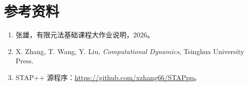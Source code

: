 ﻿\documentclass[UTF8,11pt,a4paper]{ctexart}
\begin{document}
\section*{参考资料}
\begin{enumerate}
  \item 张雄，有限元法基础课程大作业说明，2026。
  \item X. Zhang, T. Wang, Y. Liu, \textit{Computational Dynamics}, Tsinghua University Press.
  \item STAP++ 源程序：\url{https://github.com/xzhang66/STAPpp}。
\end{enumerate}
\end{document}
